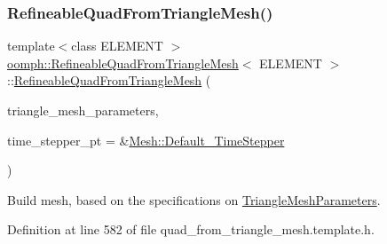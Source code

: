 \subsubsection{\texorpdfstring{Refineable\+Quad\+From\+Triangle\+Mesh()}{RefineableQuadFromTriangleMesh()}\hspace{0.1cm}{\footnotesize\ttfamily [1/2]}}
{\footnotesize\ttfamily template$<$class E\+L\+E\+M\+E\+NT $>$ \\
\hyperlink{classoomph_1_1RefineableQuadFromTriangleMesh}{oomph\+::\+Refineable\+Quad\+From\+Triangle\+Mesh}$<$ E\+L\+E\+M\+E\+NT $>$\+::\hyperlink{classoomph_1_1RefineableQuadFromTriangleMesh}{Refineable\+Quad\+From\+Triangle\+Mesh} (\begin{DoxyParamCaption}\item[{\hyperlink{classoomph_1_1TriangleMeshParameters}{Triangle\+Mesh\+Parameters} \&}]{triangle\+\_\+mesh\+\_\+parameters,  }\item[{\hyperlink{classoomph_1_1TimeStepper}{Time\+Stepper} $\ast$}]{time\+\_\+stepper\+\_\+pt = {\ttfamily \&\hyperlink{classoomph_1_1Mesh_a12243d0fee2b1fcee729ee5a4777ea10}{Mesh\+::\+Default\+\_\+\+Time\+Stepper}} }\end{DoxyParamCaption})\hspace{0.3cm}{\ttfamily [inline]}}



Build mesh, based on the specifications on \hyperlink{classoomph_1_1TriangleMeshParameters}{Triangle\+Mesh\+Parameters}. 



Definition at line 582 of file quad\+\_\+from\+\_\+triangle\+\_\+mesh.\+template.\+h.

\mbox{\label{classoomph_1_1RefineableQuadFromTriangleMesh_aa2607a703a228947cc65d9edf0ca8b0e}} 

